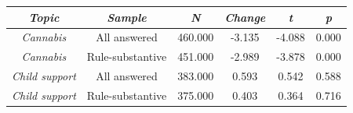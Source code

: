 \begin{tabular}{c c c c c c}
      \hline
      \textit{Topic} & \textit{Sample} & \textit{N} & \textit{Change} & \textit{t} & \textit{p} \\
      \hline
      \textit{Cannabis} & All answered & 460.000 & -3.135 & -4.088 & 0.000 \\
      \textit{Cannabis} & Rule-substantive & 451.000 & -2.989 & -3.878 & 0.000 \\
      \textit{Child support} & All answered & 383.000 & 0.593 & 0.542 & 0.588 \\
      \textit{Child support} & Rule-substantive & 375.000 & 0.403 & 0.364 & 0.716 \\
      \hline
    \end{tabular}